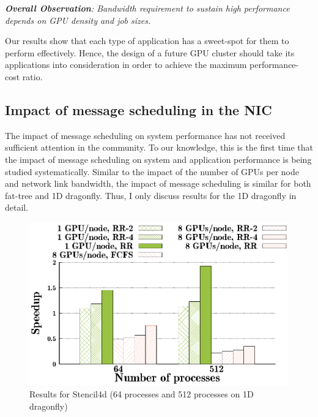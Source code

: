 \vspace{1em}
\noindent
{\it \textbf{Overall Observation}:
Bandwidth requirement to sustain high performance depends on GPU density
and job sizes.}

\noindent
Our results show that
  each type of application has a sweet-spot for them to perform effectively. 
  Hence, the design of a future GPU cluster should take its applications into
  consideration in order to achieve the maximum performance-cost ratio. 




\subsection{Impact of message scheduling in the NIC}

The impact of message scheduling on system performance has not received
sufficient attention in the community. To our knowledge, this is the first time
that the impact of message scheduling on system and application performance
is being studied systematically.
Similar to the impact of the number of GPUs per node and network link bandwidth, the impact
of message scheduling is similar for both fat-tree and 1D dragonfly. Thus, I only discuss
results for the 1D dragonfly in detail. 

\begin{figure}[t]
  \centering
  \includegraphics[width=0.8\columnwidth]{figure/plots/sched/dfly-sched-mapping-stencil.eps}
  \vspace{-0.5in}
  \caption{Results for Stencil4d (64 processes and 512 processes on 1D dragonfly)}
  \label{fig:stencil_scheduling_dfly}
\end{figure}


